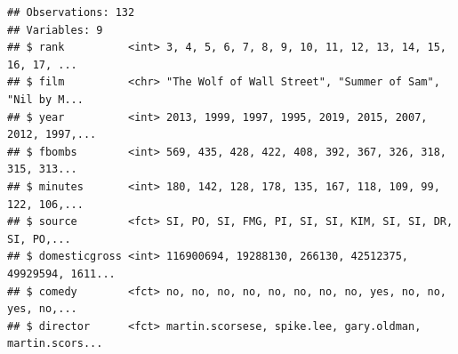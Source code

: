 \documentclass[]{article}
\newenvironment{Shaded}{\begin{snugshade}}{\end{snugshade}}
\newcommand{\DataTypeTok}[1]{\textcolor[rgb]{0.13,0.29,0.53}{#1}}
\newcommand{\KeywordTok}[1]{\textcolor[rgb]{0.13,0.29,0.53}{\textbf{#1}}}
\newcommand{\NormalTok}[1]{#1}
\newcommand{\OperatorTok}[1]{\textcolor[rgb]{0.81,0.36,0.00}{\textbf{#1}}}
\newcommand{\StringTok}[1]{\textcolor[rgb]{0.31,0.60,0.02}{#1}}
\begin{document}
\begin{Shaded}
\end{Shaded}

\begin{verbatim}
## Observations: 132
## Variables: 9
## $ rank          <int> 3, 4, 5, 6, 7, 8, 9, 10, 11, 12, 13, 14, 15, 16, 17, ...
## $ film          <chr> "The Wolf of Wall Street", "Summer of Sam", "Nil by M...
## $ year          <int> 2013, 1999, 1997, 1995, 2019, 2015, 2007, 2012, 1997,...
## $ fbombs        <int> 569, 435, 428, 422, 408, 392, 367, 326, 318, 315, 313...
## $ minutes       <int> 180, 142, 128, 178, 135, 167, 118, 109, 99, 122, 106,...
## $ source        <fct> SI, PO, SI, FMG, PI, SI, SI, KIM, SI, SI, DR, SI, PO,...
## $ domesticgross <int> 116900694, 19288130, 266130, 42512375, 49929594, 1611...
## $ comedy        <fct> no, no, no, no, no, no, no, no, yes, no, no, yes, no,...
## $ director      <fct> martin.scorsese, spike.lee, gary.oldman, martin.scors...
\end{verbatim}
\end{document}
